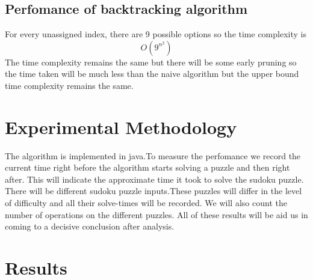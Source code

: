 \documentclass[11pt]{report}
\begin{document}
        \subsection{Perfomance of backtracking algorithm}
            For every unassigned index, there are 9 possible options so the time complexity is \begin{equation}O(9^{n^2}) \label{sec:comp}\end{equation} 
            The time complexity remains the same but there will be some early pruning so the time taken will be
            much less than the naive algorithm but the upper bound time complexity remains the same.

    \section{Experimental Methodology}
        The algorithm is implemented in java.To measure the perfomance we record the current time right
        before the algorithm starts solving a puzzle and then right after. This will indicate the approximate time it took to solve the
        sudoku puzzle. There will be different sudoku puzzle inputs.These puzzles will differ in the level of
        difficulty and all their solve-times will be recorded. We will also count the number of operations on the different puzzles. 
        All of these results  will be aid us in coming to a decisive conclusion after analysis.

    \section{Results}
\end{document}

